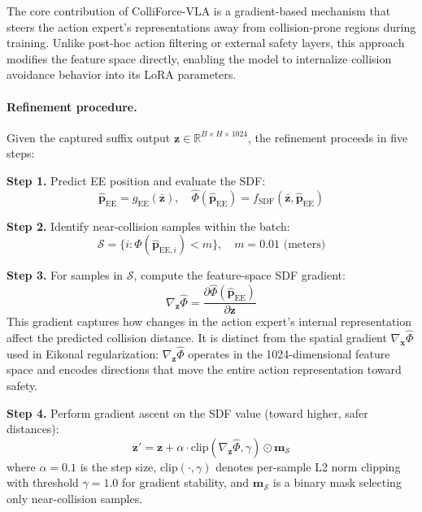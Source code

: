 The core contribution of ColliForce-VLA is a gradient-based mechanism that steers the action expert's representations away from collision-prone regions during training. Unlike post-hoc action filtering or external safety layers, this approach modifies the feature space directly, enabling the model to internalize collision avoidance behavior into its LoRA parameters.

\paragraph{Refinement procedure.} Given the captured suffix output $\mathbf{z} \in \mathbb{R}^{B \times H \times 1024}$, the refinement proceeds in five steps:

\textbf{Step 1.} Predict EE position and evaluate the SDF:
\begin{equation}
\hat{\mathbf{p}}_\mathrm{EE} = g_\mathrm{EE}(\bar{\mathbf{z}}), \quad \hat{\Phi}(\hat{\mathbf{p}}_\mathrm{EE}) = f_\mathrm{SDF}(\bar{\mathbf{z}}, \hat{\mathbf{p}}_\mathrm{EE})
\end{equation}

\textbf{Step 2.} Identify near-collision samples within the batch:
\begin{equation}\label{eq:collision_set}
\mathcal{S} = \{i : \hat{\Phi}(\hat{\mathbf{p}}_{\mathrm{EE},i}) < m\}, \quad m = 0.01 \text{ (meters)}
\end{equation}

\textbf{Step 3.} For samples in $\mathcal{S}$, compute the feature-space SDF gradient:
\begin{equation}\label{eq:feature_grad}
\nabla_{\mathbf{z}} \hat{\Phi} = \frac{\partial \hat{\Phi}(\hat{\mathbf{p}}_\mathrm{EE})}{\partial \mathbf{z}}
\end{equation}
This gradient captures how changes in the action expert's internal representation affect the predicted collision distance. It is distinct from the spatial gradient $\nabla_{\mathbf{x}} \hat{\Phi}$ used in Eikonal regularization: $\nabla_{\mathbf{z}} \hat{\Phi}$ operates in the 1024-dimensional feature space and encodes directions that move the entire action representation toward safety.

\textbf{Step 4.} Perform gradient ascent on the SDF value (toward higher, safer distances):
\begin{equation}\label{eq:gradient_ascent}
\mathbf{z}' = \mathbf{z} + \alpha \cdot \mathrm{clip}(\nabla_{\mathbf{z}} \hat{\Phi}, \gamma) \odot \mathbf{m}_\mathcal{S}
\end{equation}
where $\alpha = 0.1$ is the step size, $\mathrm{clip}(\cdot, \gamma)$ denotes per-sample L2 norm clipping with threshold $\gamma = 1.0$ for gradient stability, and $\mathbf{m}_\mathcal{S}$ is a binary mask selecting only near-collision samples.

